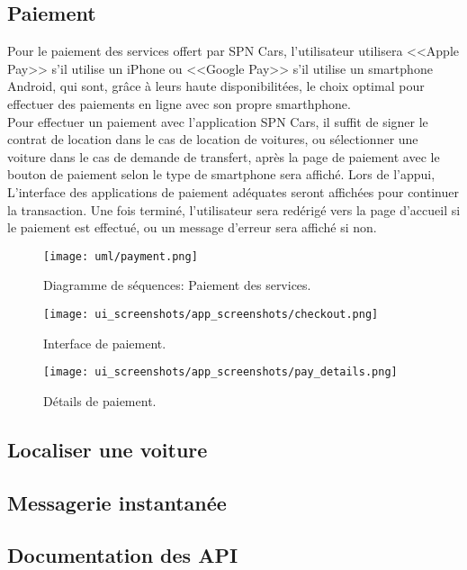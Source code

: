 \subsection{Paiement}
Pour le paiement des services offert par SPN Cars, l'utilisateur utilisera <<Apple Pay>> s'il utilise un iPhone ou <<Google Pay>> s'il utilise un smartphone Android, qui sont, grâce à leurs haute disponibilitées, le choix optimal pour effectuer des paiements en ligne avec son propre smarthphone.\\
Pour effectuer un paiement avec l'application SPN Cars, il suffit de signer le contrat de location dans le cas de location de voitures, ou sélectionner une voiture dans le cas de demande de transfert, après la page de paiement avec le bouton de paiement selon le type de smartphone sera affiché. Lors de l'appui, L'interface des applications de paiement adéquates seront affichées pour continuer la transaction. Une fois terminé, l'utilisateur sera redérigé vers la page d'accueil si le paiement est effectué, ou un message d'erreur sera affiché si non.
\vspace{1cm}
\begin{figure}[H]
    \centering
    \texttt{[image: uml/payment.png]}
    \captionsetup{justification=centering}
    \caption{Diagramme de séquences: Paiement des services.}
    \label{fig:seq_payment}
\end{figure}
\newpage
\begin{multicols}{2}
    \begin{figure}[H]
        \centering
        \texttt{[image: ui\_screenshots/app\_screenshots/checkout.png]}
        \captionsetup{justification=centering}
        \caption{Interface de paiement.}
        \label{fig:checkout}
    \end{figure}
    \begin{figure}[H]
        \centering
        \texttt{[image: ui\_screenshots/app\_screenshots/pay\_details.png]}
        \captionsetup{justification=centering}
        \caption{Détails de paiement.}
        \label{fig:pay_details}
    \end{figure}
\end{multicols}
\subsection{Localiser une voiture}
\subsection{Messagerie instantanée}
\subsection{Documentation des API}